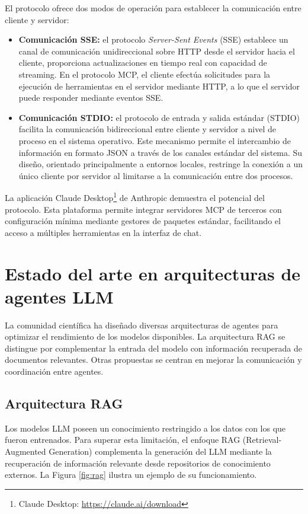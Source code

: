 El protocolo ofrece dos modos de operación para establecer la comunicación entre cliente y servidor:
\begin{itemize}
  \item{\textbf{Comunicación SSE: } el protocolo \textit{Server-Sent Events} (SSE) establece un canal de comunicación unidireccional sobre HTTP desde el servidor hacia el cliente, proporciona actualizaciones en tiempo real con capacidad de streaming. En el protocolo MCP, el cliente efectúa solicitudes para la ejecución de herramientas en el servidor mediante HTTP, a lo que el servidor puede responder mediante eventos SSE.}
\item{\textbf{Comunicación STDIO: } el protocolo de entrada y salida estándar (STDIO) facilita la comunicación bidireccional entre cliente y servidor a nivel de proceso en el sistema operativo. Este mecanismo permite el intercambio de información en formato JSON a través de los canales estándar del sistema. Su diseño, orientado principalmente a entornos locales, restringe la conexión a un único cliente por servidor al limitarse a la comunicación entre dos procesos.}
\end{itemize}
La aplicación Claude Desktop\footnote{Claude Desktop: \url{https://claude.ai/download}} de Anthropic demuestra el potencial del protocolo. Esta plataforma permite integrar servidores MCP de terceros con configuración mínima mediante gestores de paquetes estándar, facilitando el acceso a múltiples herramientas en la interfaz de chat.

\section{Estado del arte en arquitecturas de agentes LLM}
\label{sec:estado_arte}

La comunidad científica ha diseñado diversas arquitecturas de agentes para optimizar el rendimiento de los modelos disponibles. La arquitectura RAG se distingue por complementar la entrada del modelo con información recuperada de documentos relevantes. Otras propuestas se centran en mejorar la comunicación y coordinación entre agentes.

\subsection{Arquitectura RAG}

Los modelos LLM poseen un conocimiento restringido a los datos con los que fueron entrenados. Para superar esta limitación, el enfoque RAG (Retrieval-Augmented Generation) complementa la generación del LLM mediante la recuperación de información relevante desde repositorios de conocimiento externos. La Figura \ref{fig:rag} ilustra un ejemplo de su funcionamiento.    

